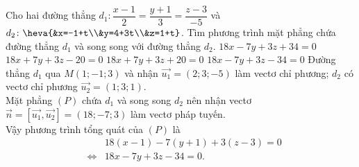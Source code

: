 \begin{ex}%
	Cho hai đường thẳng $ d_1 \colon \dfrac{x-1}{2}=\dfrac{y+1}{3}=\dfrac{z-3}{-5} $ và $ d_2\colon \heva{&x=-1+t\\&y=4+3t\\&z=1+t} $. Tìm phương trình mặt phẳng chứa đường thẳng $ d_1 $ và song song với đường thẳng $ d_2. $
	\choice
	{$ 18x-7y+3z+34=0 $}
	{$ 18x+7y+3z-20=0 $}
	{$ 18x+7y+3z+20=0 $}
	{\True $ 18x-7y+3z-34=0 $}
	\loigiai
	{Đường thẳng $ d_1 $ qua $ M(1;-1;3) $ và nhận $ \vec{u_1} =(2;3;-5) $ làm vectơ chỉ phương; $ d_2 $ có vectơ chỉ phương $ \vec{u_2}=(1;3;1) $.\\
		Mặt phẳng $ (P) $ chứa $ d_1 $ và song song $ d_2 $ nên nhận vectơ $ \vec{n} = \left[\vec{u_1},\vec{u_2}\right]=(18;-7;3) $ làm vectơ pháp tuyến.\\
		Vậy phương trình tổng quát của $ (P)$ là \begin{eqnarray*}
			&&18(x-1)-7(y+1)+3(z-3)=0\\ &\Leftrightarrow& 18x-7y+3z-34=0.
		\end{eqnarray*}
	}
\end{ex}

